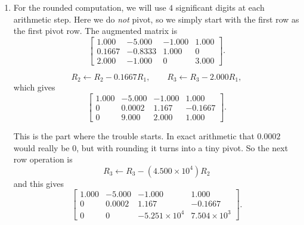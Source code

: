 \documentclass[10pt]{extarticle}
\begin{document}
\begin{enumerate}[label=(\alph*)]
\[\begin{array}{ccc|c}
\end{array}
\right].
\]
\[
R_1\leftarrow R_1+R_2,
\]
\[
\left[
\begin{array}{ccc|c}
2 & 0 & 0 & \frac{22}{7}\\
0 & 1 & 0 & \frac{1}{7}\\
0 & 0 & 1 & -\frac{1}{7}
\end{array}
\right].
\]
\[
R_1\leftarrow \frac{1}{2}R_1,
\]
\[
\left[
\begin{array}{ccc|c}
1 & 0 & 0 & \frac{11}{7}\\
0 & 1 & 0 & \frac{1}{7}\\
0 & 0 & 1 & -\frac{1}{7}
\end{array}
\right].
\]
So the exact solution is
\[
\boxed{
\begin{pmatrix}
x\\
y\\
z
\end{pmatrix}
=
\begin{pmatrix}
\frac{11}{7}\\[0.3em]
\frac{1}{7}\\[0.3em]
-\frac{1}{7}
\end{pmatrix}}.
\]

\item For the rounded computation, we will use $4$ significant digits at each arithmetic step. Here we do \emph{not} pivot, so we simply start with the first row as the first pivot row. The augmented matrix is
\[
\left[
\begin{array}{ccc|c}
1.000 & -5.000 & -1.000 & 1.000\\
0.1667 & -0.8333 & 1.000 & 0\\
2.000 & -1.000 & 0 & 3.000
\end{array}
\right].
\]

\[
R_2\leftarrow R_2-0.1667R_1,\qquad R_3\leftarrow R_3-2.000R_1,
\]
which gives
\[
\left[
\begin{array}{ccc|c}
1.000 & -5.000 & -1.000 & 1.000\\
0 & 0.0002 & 1.167 & -0.1667\\
0 & 9.000 & 2.000 & 1.000
\end{array}
\right].
\]

This is the part where the trouble starts. In exact arithmetic that $0.0002$ would really be $0$, but with rounding it turns into a tiny pivot. So the next row operation is
\[
R_3\leftarrow R_3-(4.500\times 10^4)R_2
\]
and this gives
\[
\left[
\begin{array}{ccc|c}
1.000 & -5.000 & -1.000 & 1.000\\
0 & 0.0002 & 1.167 & -0.1667\\
0 & 0 & -5.251\times 10^4 & 7.504\times 10^3
\end{array}
\right].
\]


\end{enumerate}
\end{document}
